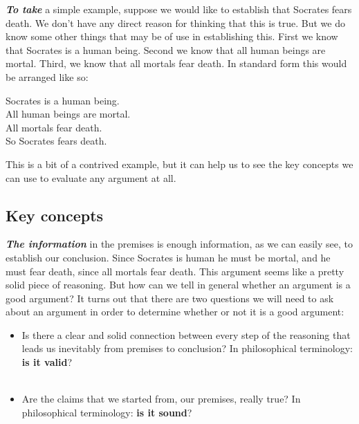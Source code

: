 \documentclass[12pt, openany]{book}
\makeatletter
\providecommand{\tightlist}{%
  \setlength{\itemsep}{0pt}\setlength{\parskip}{0pt}}
\newenvironment{kframe}{%
\medskip{}
\setlength{\fboxsep}{.8em}
 \def\at@end@of@kframe{}%
 \ifinner\ifhmode%
  \def\at@end@of@kframe{\end{minipage}}%
  \begin{minipage}{\columnwidth}%
 \fi\fi%
 \def\FrameCommand##1{\hskip\@totalleftmargin \hskip-\fboxsep
 \colorbox{shadecolor}{##1}\hskip-\fboxsep
     \hskip-\linewidth \hskip-\@totalleftmargin \hskip\columnwidth}%
 \MakeFramed {\advance\hsize-\width
   \@totalleftmargin\z@ \linewidth\hsize
   \@setminipage}}%
 {\par\unskip\endMakeFramed%
 \at@end@of@kframe}
\newenvironment{rmdblock}[1]
  {
  \begin{itemize}
  \renewcommand{\labelitemi}{
    \raisebox{-.7\height}[0pt][0pt]{
      {\setkeys{Gin}{width=3em,keepaspectratio}\texttt{[image: img/\#1]}}
    }
  }
  \setlength{\fboxsep}{1em}
  \begin{kframe}
  \item
  }
  {
  \end{kframe}
  \end{itemize}
  }
\newenvironment{rmdnote}
  {\begin{rmdblock}{note}}
  {\end{rmdblock}}
\makeatother
\begin{document}
\textbf{\emph{To take}} a simple example, suppose we would like to establish that Socrates fears death. We don't have any direct reason for thinking that this is true. But we do know some other things that may be of use in establishing this. First we know that Socrates is a human being. Second we know that all human beings are mortal. Third, we know that all mortals fear death. In standard form this would be arranged like so:

\begin{center}

\begin{argument}

Socrates is a human being.\\
All human beings are mortal.\\
All mortals fear death.\\

So Socrates fears death.

\end{argument}

\end{center}

This is a bit of a contrived example, but it can help us to see the key concepts we can use to evaluate any argument at all.

\hypertarget{key-concepts}{%
\subsection*{Key concepts}\label{key-concepts}}


\textbf{\emph{The information}} in the premises is enough information, as we can easily see, to establish our conclusion. Since Socrates is human he must be mortal, and he must fear death, since all mortals fear death. This argument seems like a pretty solid piece of reasoning. But how can we tell in general whether an argument is a good argument? It turns out that there are two questions we will need to ask about an argument in order to determine whether or not it is a good argument:

\begin{rmdnote}

\begin{itemize}
\tightlist
\item
  Is there a clear and solid connection between every step of the reasoning that leads us inevitably from premises to conclusion? In philosophical terminology: \textbf{is it valid}?\\
  ~\\
\item
  Are the claims that we started from, our premises, really true? In philosophical terminology: \textbf{is it sound}?
\end{itemize}

\end{rmdnote}
\end{document}
